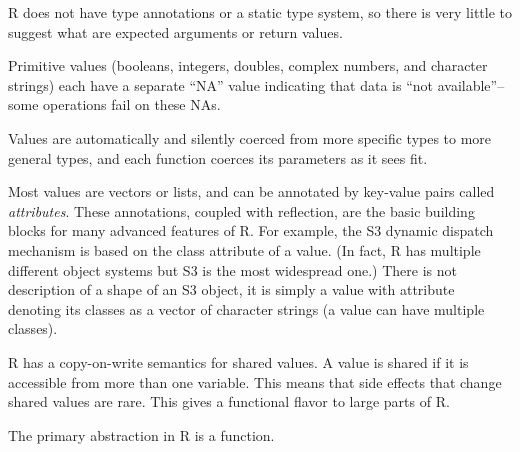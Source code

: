 \documentclass[sigplan,nonacm,anonymous,review]{acmart}
\begin{document}
\begin{compactitem}[$-$]

\item R does not have type annotations or a static type system, so there is very little to suggest what are expected arguments or return values.

\item Primitive values (booleans, integers, doubles, complex numbers, and character strings) each have a separate ``NA'' value indicating that data is ``not available''--some operations fail on these NAs.

\item Values are automatically and silently coerced from more specific types to more general types, and each function coerces its parameters as it sees fit.

\item Most values are vectors or lists, and can be annotated by key-value pairs called \textit{attributes}. 
These annotations, coupled with reflection, are the basic building blocks for many advanced features of R. 
For example, the S3 dynamic dispatch mechanism is based on the class attribute of a value.
(In fact, R has multiple different object systems but S3 is the most widespread one.)
There is not description of a shape of an S3 object, it is simply a value with  attribute denoting its classes as a vector of character strings (a value can have multiple classes).


\item R has a copy-on-write semantics for shared values. A value is shared if
    it is accessible from more than one variable. This means that side effects
    that change shared values are rare. This gives a functional flavor to large
    parts of R.

 \item The primary abstraction in R is a function.
\end{compactitem}
\end{document}
